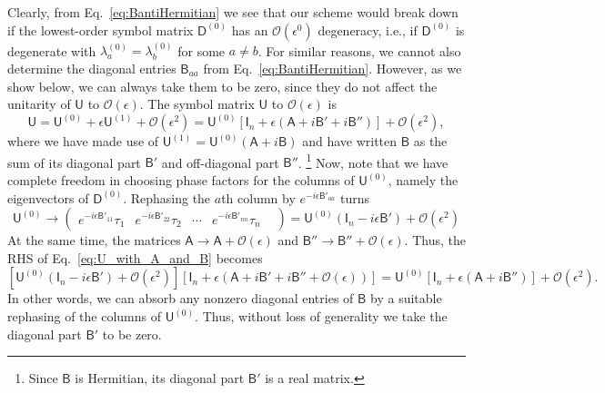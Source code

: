 Clearly, from Eq.~\eqref{eq:BantiHermitian} we see that our scheme would break down if the lowest-order symbol matrix $\mathsf{D}^{(0)}$ has an $\mathcal{O}(\epsilon^{0})$ degeneracy, i.e., if $\mathsf{D}^{(0)}$ is degenerate with $\lambda^{(0)}_{a} = \lambda^{(0)}_{b}$ for some $a \neq b$.
For similar reasons, we cannot also determine the diagonal entries $\mathsf{B}_{aa}$ from Eq.~\eqref{eq:BantiHermitian}.
However, as we show below, we can always take them to be zero, since they do not affect the unitarity of $\mathsf{U}$ to $\mathcal{O}(\epsilon)$.
The symbol matrix $\mathsf{U}$ to $\mathcal{O}(\epsilon)$ is
%
\begin{equation}
  \mathsf{U} = \mathsf{U}^{(0)} + \epsilon \mathsf{U}^{(1)} + \mathcal{O}(\epsilon^{2}) = \mathsf{U}^{(0)}\left[\mathsf{I}_{n} + \epsilon\left(\mathsf{A} + i\mathsf{B}' + i\mathsf{B}'' \right)\right] + \mathcal{O}(\epsilon^{2}),
  \label{eq:U_with_A_and_B}
\end{equation}
%
where we have made use of $\mathsf{U}^{(1)} = \mathsf{U}^{(0)}(\mathsf{A} + i\mathsf{B})$ and have written $\mathsf{B}$ as the sum of its diagonal part $\mathsf{B}'$ and off-diagonal part $\mathsf{B}''$.%
\footnote{Since $\mathsf{B}$ is Hermitian, its diagonal part $\mathsf{B}'$ is a real matrix.}
Now, note that we have complete freedom in choosing phase factors for the columns of $\mathsf{U}^{(0)}$, namely the eigenvectors of $\mathsf{D}^{(0)}$.
Rephasing the $a$th column by $e^{-i\epsilon\mathsf{B}'_{aa}}$ turns
%
\begin{equation}
    \mathsf{U}^{(0)} \to
      \begin{pmatrix}
        e^{-i\epsilon\mathsf{B}'_{11}}\tau_{1} &
        e^{-i\epsilon\mathsf{B}'_{22}}\tau_{2} &
        \cdots &
        e^{-i\epsilon\mathsf{B}'_{nn}}\tau_{n} &
      \end{pmatrix}
      = \mathsf{U}^{(0)}(\mathsf{I}_{n} - i\epsilon\mathsf{B}') + \mathcal{O}(\epsilon^{2})
\end{equation}
%
At the same time, the matrices $\mathsf{A} \to \mathsf{A} + \mathcal{O}(\epsilon)$ and $\mathsf{B}'' \to \mathsf{B}'' + \mathcal{O}(\epsilon)$.
Thus, the RHS of Eq.~\eqref{eq:U_with_A_and_B} becomes
%
\begin{equation}
  \left[\mathsf{U}^{(0)}(\mathsf{I}_{n} - i\epsilon\mathsf{B}') + \mathcal{O}(\epsilon^{2})\right]\left[\mathsf{I}_{n} + \epsilon\left(\mathsf{A} + i\mathsf{B}' + i\mathsf{B}'' + \mathcal{O}(\epsilon)\right)\right]
  =
  \mathsf{U}^{(0)}\left[\mathsf{I}_{n} + \epsilon\left(\mathsf{A} + i\mathsf{B}'' \right)\right] + \mathcal{O}(\epsilon^{2}).
\end{equation}
%
In other words, we can absorb any nonzero diagonal entries of $\mathsf{B}$ by a suitable rephasing of the columns of $\mathsf{U}^{(0)}$.
Thus, without loss of generality we take the diagonal part $\mathsf{B}'$ to be zero.


